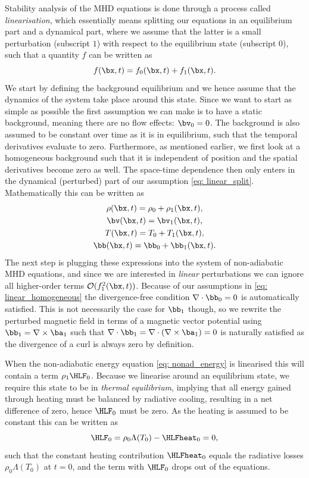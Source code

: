 Stability analysis of the MHD equations is done through a process called \emph{linearisation}, which essentially means splitting our equations in an equilibrium part and a dynamical part, where we assume that the latter is a small perturbation (subscript $1$) with respect to the equilibrium state (subscript $0$), such that a quantity $f$ can be written as
\begin{equation} \label{eq: linear_split}
  f(\bx, t) = f_0(\bx, t) + f_1(\bx, t).
\end{equation}
We start by defining the background equilibrium and we hence assume that the dynamics of the system take place around this state. Since we want to start as simple as possible the first assumption we can make is to have a static background, meaning there are no flow effects: $\bv_0 = 0$. The background is also assumed to be constant over time as it is in equilibrium, such that the temporal derivatives evaluate to zero. Furthermore, as mentioned earlier, we first look at a homogeneous background such that it is independent of position and the spatial derivatives become zero as well. The space-time dependence then only enters in the dynamical (perturbed) part of our assumption \eqref{eq: linear_split}. Mathematically this can be written as
\begin{equation} \label{eq: linear_homogeneous}
  \begin{gathered}
    \rho(\bx, t) = \rho_0 + \rho_1(\bx, t), \\
    \bv(\bx, t) = \bv_1(\bx, t), \\
    T(\bx, t) = T_0 + T_1(\bx, t), \\
    \bb(\bx, t) = \bb_0 + \bb_1(\bx, t).
  \end{gathered}
\end{equation}
The next step is plugging these expressions into the system of non-adiabatic MHD equations, and since we are interested in \emph{linear} perturbations we can ignore all higher-order terms $\mathcal{O}(f_1^2(\bx, t))$. Because of our assumptions in \eqref{eq: linear_homogeneous} the divergence-free condition $\nabla \cdot \bb_0 = 0$ is automatically satisfied. This is not necessarily the case for $\bb_1$ though, so we rewrite the perturbed magnetic field in terms of a magnetic vector potential using $\bb_1 = \nabla \times \ba_1$ such that $\nabla \cdot \bb_1 = \nabla \cdot \left(\nabla \times \ba_1\right) = 0$ is naturally satisfied as the divergence of a curl is always zero by definition.

When the non-adiabatic energy equation \eqref{eq: nonad_energy} is linearised this will contain a term $\rho_1\HLF_0$. Because we linearise around an equilibrium state, we require this state to be in \emph{thermal equilibrium}, implying that all energy gained through heating must be balanced by radiative cooling, resulting in a net difference of zero, hence $\HLF_0$ must be zero. As the heating is assumed to be constant this can be written as
\begin{equation}
  \HLF_0 = \rho_0\Lambda(T_0) - \HLFheat_0 = 0,
\end{equation}
such that the constant heating contribution $\HLFheat_0$ equals the radiative losses $\rho_0\Lambda(T_0)$ at $t = 0$, and the term with $\HLF_0$ drops out of the equations.

